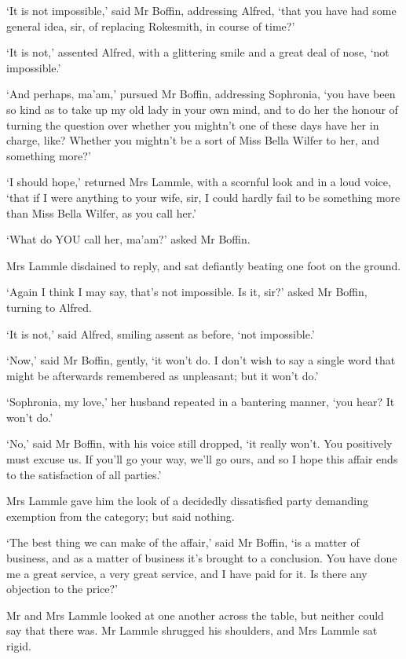 ‘It is not impossible,’ said Mr Boffin, addressing Alfred, ‘that you
have had some general idea, sir, of replacing Rokesmith, in course of
time?’

‘It is not,’ assented Alfred, with a glittering smile and a great deal
of nose, ‘not impossible.’

‘And perhaps, ma’am,’ pursued Mr Boffin, addressing Sophronia, ‘you have
been so kind as to take up my old lady in your own mind, and to do her
the honour of turning the question over whether you mightn’t one of
these days have her in charge, like? Whether you mightn’t be a sort of
Miss Bella Wilfer to her, and something more?’

‘I should hope,’ returned Mrs Lammle, with a scornful look and in a loud
voice, ‘that if I were anything to your wife, sir, I could hardly fail
to be something more than Miss Bella Wilfer, as you call her.’

‘What do YOU call her, ma’am?’ asked Mr Boffin.

Mrs Lammle disdained to reply, and sat defiantly beating one foot on the
ground.

‘Again I think I may say, that’s not impossible. Is it, sir?’ asked Mr
Boffin, turning to Alfred.

‘It is not,’ said Alfred, smiling assent as before, ‘not impossible.’

‘Now,’ said Mr Boffin, gently, ‘it won’t do. I don’t wish to say a
single word that might be afterwards remembered as unpleasant; but it
won’t do.’

‘Sophronia, my love,’ her husband repeated in a bantering manner, ‘you
hear? It won’t do.’

‘No,’ said Mr Boffin, with his voice still dropped, ‘it really won’t.
You positively must excuse us. If you’ll go your way, we’ll go ours, and
so I hope this affair ends to the satisfaction of all parties.’

Mrs Lammle gave him the look of a decidedly dissatisfied party demanding
exemption from the category; but said nothing.

‘The best thing we can make of the affair,’ said Mr Boffin, ‘is a matter
of business, and as a matter of business it’s brought to a conclusion.
You have done me a great service, a very great service, and I have paid
for it. Is there any objection to the price?’

Mr and Mrs Lammle looked at one another across the table, but neither
could say that there was. Mr Lammle shrugged his shoulders, and Mrs
Lammle sat rigid.


